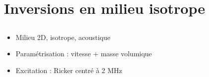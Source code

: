 \section{Inversions en milieu isotrope}
\subsection*{}
\begin{frame}{\insertsectionhead}
	\begin{itemize}
		\item<1-> Milieu 2D, isotrope, acoustique
		\item<1-> Paramétrisation : vitesse + masse volumique
		\item<2-> Excitation : Ricker centré à 2 MHz 
	\end{itemize}	
	

\end{frame}
